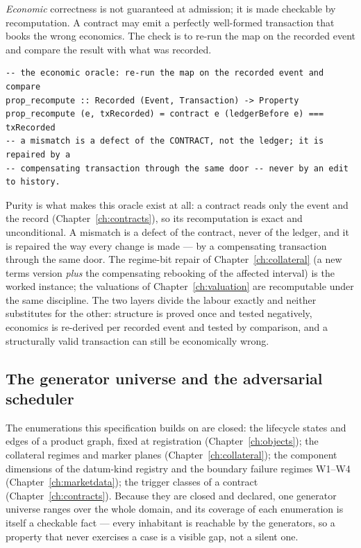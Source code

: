 \emph{Economic} correctness is not guaranteed at admission; it is made checkable by
recomputation. A contract may emit a perfectly well-formed transaction that books the wrong
economics. The check is to re-run the map on the recorded event and compare the result with
what was recorded.

\begin{lstlisting}
-- the economic oracle: re-run the map on the recorded event and compare
prop_recompute :: Recorded (Event, Transaction) -> Property
prop_recompute (e, txRecorded) = contract e (ledgerBefore e) === txRecorded
-- a mismatch is a defect of the CONTRACT, not the ledger; it is repaired by a
-- compensating transaction through the same door -- never by an edit to history.
\end{lstlisting}

Purity is what makes this oracle exist at all: a contract reads only the event and the
record (Chapter~\ref{ch:contracts}), so its recomputation is exact and unconditional. A
mismatch is a defect of the contract, never of the ledger, and it is repaired the way every
change is made --- by a compensating transaction through the same door. The regime-bit
repair of Chapter~\ref{ch:collateral} (a new terms version \emph{plus} the compensating
rebooking of the affected interval) is the worked instance; the valuations of
Chapter~\ref{ch:valuation} are recomputable under the same discipline. The two layers
divide the labour exactly and neither substitutes for the other: structure is proved once
and tested negatively, economics is re-derived per recorded event and tested by comparison,
and a structurally valid transaction can still be economically wrong.

\subsection{The generator universe and the adversarial scheduler}

The enumerations this specification builds on are closed: the lifecycle states and edges of
a product graph, fixed at registration (Chapter~\ref{ch:objects}); the collateral regimes
and marker planes (Chapter~\ref{ch:collateral}); the component dimensions of the datum-kind
registry and the boundary failure regimes W1--W4 (Chapter~\ref{ch:marketdata}); the trigger
classes of a contract (Chapter~\ref{ch:contracts}). Because they are closed and declared,
one generator universe ranges over the whole domain, and its coverage of each enumeration is
itself a checkable fact --- every inhabitant is reachable by the generators, so a property
that never exercises a case is a visible gap, not a silent one.

